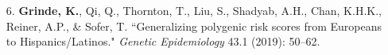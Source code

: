 \documentclass[margin]{res}
\begin{document}
\begin{resume}
\begin{itemize}
\item[6.] \textbf{Grinde, K.}, Qi, Q., Thornton, T., Liu, S., Shadyab, A.H., Chan, K.H.K., Reiner, A.P., \& Sofer, T. ``Generalizing polygenic risk scores from Europeans to Hispanics/Latinos." \textit{Genetic Epidemiology} 43.1 (2019): 50--62. 
 

\end{itemize}
\end{resume}
\end{document}

